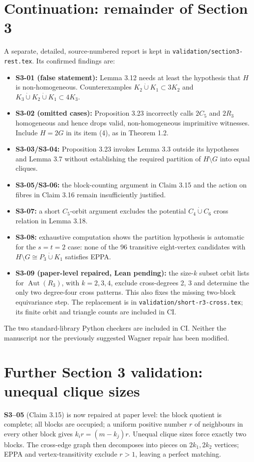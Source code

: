 \documentclass[11pt,a4paper]{article}
\begin{document}
\section*{Continuation: remainder of Section 3}
A separate, detailed, source-numbered report is kept in
\texttt{validation/section3-rest.tex}. Its confirmed findings are:
\begin{itemize}
\item \textbf{S3-01 (false statement):} Lemma 3.12 needs at least
the hypothesis that \(H\) is non-homogeneous. Counterexamples
\(K_2\dot\cup K_1\subset3K_2\) and
\(K_3\dot\cup K_2\dot\cup K_1\subset4K_3\).
\item \textbf{S3-02 (omitted cases):} Proposition 3.23 incorrectly calls
\(2C_5\) and \(2R_3\) homogeneous and hence drops valid,
non-homogeneous imprimitive witnesses. Include \(H=2G\)
in its item (4), as in Theorem 1.2.
\item \textbf{S3-03/S3-04:} Proposition 3.23 invokes Lemma 3.3
outside its hypotheses and Lemma 3.7 without establishing
the required partition of \(H\setminus G\) into equal cliques.
\item \textbf{S3-05/S3-06:} the block-counting argument in
Claim 3.15 and the action on fibres in Claim 3.16
remain insufficiently justified.
\item \textbf{S3-07:} a short \(C_5\)-orbit argument excludes
the potential \(C_4\dot\cup C_6\) cross relation in Lemma 3.18.
\item \textbf{S3-08:} exhaustive computation shows the partition
hypothesis is automatic for the \(s=t=2\) case:
none of the 96 transitive eight-vertex candidates with
\(H\setminus G\cong P_3\dot\cup K_1\) satisfies EPPA.
\item \textbf{S3-09 (paper-level repaired, Lean pending):}
the size-\(k\) subset orbit lists for \(\operatorname{Aut}(R_3)\),
with \(k=2,3,4\), exclude cross-degrees 2, 3 and determine
the only two degree-four cross patterns. This also fixes
the missing two-block equivariance step. The replacement is
in \texttt{validation/short-r3-cross.tex}; its finite
orbit and triangle counts are included in CI.
\end{itemize}
The two standard-library Python checkers are included in CI.
Neither the manuscript nor the previously suggested Wagner
repair has been modified.


\section*{Further Section 3 validation: unequal clique sizes}
\textbf{S3--05} (Claim 3.15) is now repaired at paper level:
the block quotient is complete; all blocks are occupied;
a uniform positive number \(r\) of neighbours in every
other block gives \(k_ir=(m-k_j)r\).
Unequal clique sizes force exactly two blocks.
The cross-edge graph then decomposes into pieces on
\(2k_1,2k_2\) vertices; EPPA and vertex-transitivity
exclude \(r>1\), leaving a perfect matching.
\end{document}
